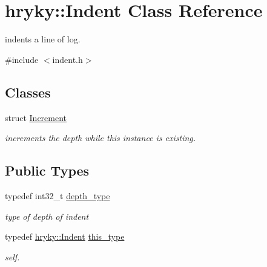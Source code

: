 \hypertarget{classhryky_1_1_indent}{\section{hryky\-:\-:Indent Class Reference}
\label{classhryky_1_1_indent}
}


indents a line of log.  




{\ttfamily \#include $<$indent.\-h$>$}

\subsection*{Classes}
\begin{DoxyCompactItemize}
\item 
struct \hyperlink{structhryky_1_1_indent_1_1_increment}{Increment}
\begin{DoxyCompactList}\small\item\em increments the depth while this instance is existing. \end{DoxyCompactList}\end{DoxyCompactItemize}
\subsection*{Public Types}
\begin{DoxyCompactItemize}
\item 
\hypertarget{classhryky_1_1_indent_a38d8402509b64e77009a1a86b6be4939}{typedef int32\-\_\-t \hyperlink{classhryky_1_1_indent_a38d8402509b64e77009a1a86b6be4939}{depth\-\_\-type}}\label{classhryky_1_1_indent_a38d8402509b64e77009a1a86b6be4939}

\begin{DoxyCompactList}\small\item\em type of depth of indent \end{DoxyCompactList}\item 
\hypertarget{classhryky_1_1_indent_acbe5e44b7c58ede382914e8a3f7d2987}{typedef \hyperlink{classhryky_1_1_indent}{hryky\-::\-Indent} \hyperlink{classhryky_1_1_indent_acbe5e44b7c58ede382914e8a3f7d2987}{this\-\_\-type}}\label{classhryky_1_1_indent_acbe5e44b7c58ede382914e8a3f7d2987}

\begin{DoxyCompactList}\small\item\em self. \end{DoxyCompactList}\end{DoxyCompactItemize}
